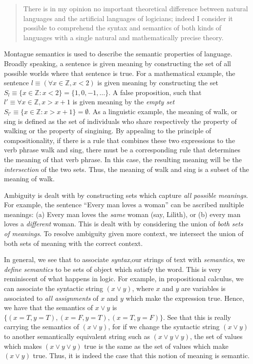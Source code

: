 \documentclass[11pt]{book}
\newcommand{\Z}{\ensuremath{\mathbb Z}}
\begin{document}
\begin{quote} There is in my opinion no important theoretical difference
    between natural languages and the artificial languages of logicians; indeed
    I consider it possible to comprehend the syntax and semantics of both kinds
    of languages with a single natural and mathematically precise theory.
\end{quote}

Montague semantics is used to describe the semantic properties of language.
Broadly speaking, a sentence is given meaning by constructing the set of all
possible worlds where that sentence is true. For a mathematical example, the
sentence $l \equiv (\forall x \in \Z, x < 2)$ is given meaning by constructing
the set $S_l \equiv \{ x \in \Z : x < 2 \} = \{1, 0, -1, \dots \}$. A false
proposition, such that $l' \equiv \forall x \in \Z, x > x + 1$ is given meaning
by the \emph{empty set} $S_{l'} \equiv \{ x \in \Z: x > x + 1 \} = \emptyset$.
As a linguistic example, the meaning of walk, or sing is defined as the set of
individuals who share respectively the property of walking or the property of
singining.  By appealing to the principle of compositionality, if there is a
rule that combines these two expressions to the verb phrase walk and sing,
there must be a corresponding rule that determines the meaning of that verb
phrase. In this case, the resulting meaning will be the \emph{intersection} of
the two sets.  Thus, the meaning of walk and sing is a subset of the meaning of
walk.

Ambiguity is dealt with by constructing sets which capture \emph{all possible
meanings}.  For example, the sentence ``Every man loves a woman'' can be ascribed
multiple meanings: (a) Every man loves the \emph{same} woman (say, Lilith), or
(b) every man loves a \emph{different} woman. This is dealt with by considering
the union of \emph{both sets of meanings}. To resolve ambiguity given more
context, we intersect the union of both sets of meaning with the correct context.

In general, we see that to associate \emph{syntax},our strings of text with
\emph{semantics}, we \emph{define semantics} to be sets of object which satisfy the word.
This is very reminiscent of what happens in logic. For example, in propositional calculus,
we can associate the syntactic string
$(x \lor y)$, where $x$ and $y$ are variables is associated to \emph{all assignments} of $x$ and $y$ which make
the expression true. Hence, we have that the semantics of $x \lor y$ is $\{ (x=T, y=T), (x=F, y=T), (x=T, y=F) \}$.
See that this is really carrying the semantics of $(x \lor y)$, for if we change
the syntactic string $(x \lor y)$ to another semantically equivalent string such
as $(x \lor y \lor y)$, the set of values which makes $(x \lor y \lor y)$ true is
the same as the set of values which make $(x \lor y)$ true. Thus, it is indeed the case
that this notion of meaning is semantic.
\end{document}
